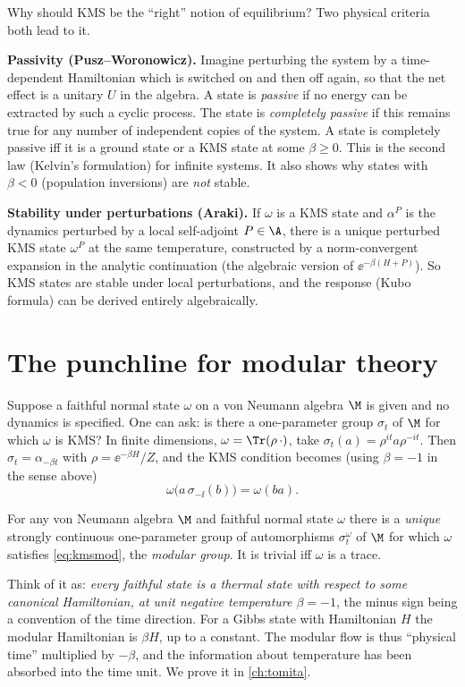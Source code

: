 Why should KMS be the ``right'' notion of equilibrium? Two physical criteria both lead to it.

\textbf{Passivity (Pusz--Woronowicz).} Imagine perturbing the system by a time-dependent Hamiltonian which is switched on and then off again, so that the net effect is a unitary $U$ in the algebra. A state is \emph{passive} if no energy can be extracted by such a cyclic process. The state is \emph{completely passive} if this remains true for any number of independent copies of the system. A state is completely passive iff it is a ground state or a KMS state at some $\beta\ge0$. This is the second law (Kelvin's formulation) for infinite systems. It also shows why states with $\beta<0$ (population inversions) are \emph{not} stable.

\textbf{Stability under perturbations (Araki).} If $\omega$ is a KMS state and $\alpha^P$ is the dynamics perturbed by a local self-adjoint $P\in\A$, there is a unique perturbed KMS state $\omega^P$ at the same temperature, constructed by a norm-convergent expansion in the analytic continuation (the algebraic version of $\ee^{-\beta(H+P)}$). So KMS states are stable under local perturbations, and the response (Kubo formula) can be derived entirely algebraically.

\section{The punchline for modular theory}

Suppose a faithful normal state $\omega$ on a von Neumann algebra $\M$ is given and no dynamics is specified. One can ask: is there a one-parameter group $\sigma_t$ of $\M$ for which $\omega$ is KMS? In finite dimensions, $\omega=\Tr(\rho\,\cdot)$, take $\sigma_t(a)=\rho^{it}a\rho^{-it}$. Then $\sigma_t=\alpha_{-\beta t}$ with $\rho=\ee^{-\beta H}/Z$, and the KMS condition becomes (using $\beta=-1$ in the sense above)
\begin{equation}
\omega\big(a\,\sigma_{-\ii}(b)\big)=\omega(ba).\label{eq:kmsmod}
\end{equation}
\begin{theorem}
For any von Neumann algebra $\M$ and faithful normal state $\omega$ there is a \emph{unique} strongly continuous one-parameter group of automorphisms $\sigma^\omega_t$ of $\M$ for which $\omega$ satisfies \eqref{eq:kmsmod}, the \emph{modular group}. It is trivial iff $\omega$ is a trace.
\end{theorem}
Think of it as: \emph{every faithful state is a thermal state with respect to some canonical Hamiltonian, at unit negative temperature $\beta=-1$}, the minus sign being a convention of the time direction. For a Gibbs state with Hamiltonian $H$ the modular Hamiltonian is $\beta H$, up to a constant. The modular flow is thus ``physical time'' multiplied by $-\beta$, and the information about temperature has been absorbed into the time unit. We prove it in \cref{ch:tomita}.


